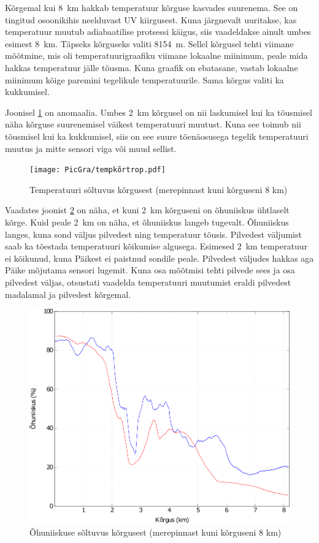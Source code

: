 \documentclass{trkut}%
\begin{document}
Kõrgemal kui \SI{8}{km} hakkab temperatuur kõrguse kasvades suurenema. See on tingitud osoonikihis neelduvast UV kiirgusest. Kuna järgnevalt uuritakse, kas temperatuur muutub adiabaatilise protsessi käigus, siis vaadeldakse ainult umbes esimest \SI{8}{km}. Täpseks kõrguseks valiti \SI{8154}{m}. Sellel kõrgusel tehti viimane mõõtmine, mis oli temperatuurigraafiku viimane lokaalne miinimum, peale mida hakkas temperatuur jälle tõusma. Kuna graafik on ebatasane, vastab lokaalne miinimum kõige paremini tegelikule temperatuurile. Sama kõrgus valiti ka kukkumisel.

Joonisel \ref{tempkõrtrop} on anomaalia. Umbes \SI{2}{km} kõrgusel on nii laskumisel kui ka tõusmisel näha kõrguse suurenemisel väikest temperatuuri muutust. Kuna see toimub nii tõusmisel kui ka kukkumisel, siis on see suure tõenäosusega tegelik temperatuuri muutus ja mitte sensori viga või muud sellist.
\begin{figure}[h]
	\texttt{[image: PicGra/tempkõrtrop.pdf]}
	\caption{Temperatuuri sõltuvus kõrgusest (merepinnast kuni kõrguseni 8 km)}
	\label{tempkõrtrop}%
\end{figure}

Vaadates joonist \ref{humkõrtrop} on näha, et kuni \SI{2}{km} kõrguseni on õhuniiskus ühtlaselt kõrge. Kuid peale \SI{2}{km} on näha, et õhuniiskus langeb tugevalt. Õhuniiskus langes, kuna sond väljus pilvedest ning temperatuur tõusis. Pilvedest väljumist saab ka tõestada temperatuuri kõikumise algusega. Esimesed \SI{2}{km} temperatuur ei kõikunud, kuna Päikest ei paistnud sondile peale. Pilvedest väljudes hakkas aga Päike mõjutama sensori lugemit. Kuna osa mõõtmisi tehti pilvede sees ja osa pilvedest väljas, otsustati vaadelda temperatuuri muutumist eraldi pilvedest madalamal ja pilvedest kõrgemal.
\begin{figure}[h]
	\includegraphics[width=1\textwidth]{PicGra/humkõrtrop.pdf}
	\caption{Õhuniiskuse sõltuvus kõrgusest (merepinnast kuni kõrguseni 8 km)}
	\label{humkõrtrop}%
\end{figure}
\end{document}
